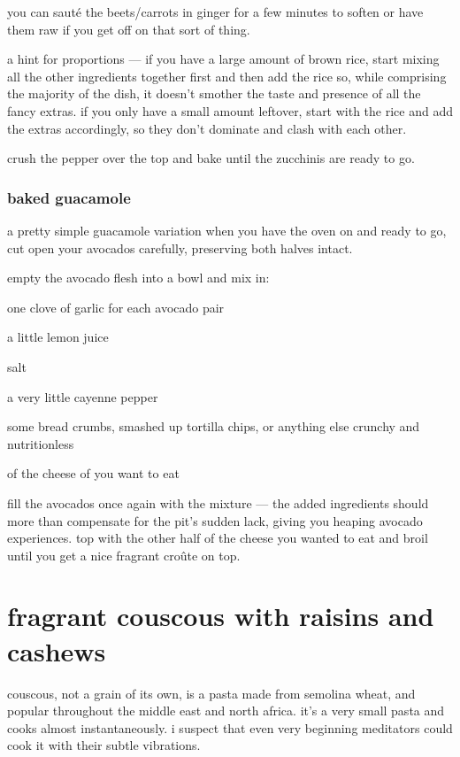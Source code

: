you can saut\'{e} the beets/carrots in ginger for a few minutes to soften or 
have them raw if you get off on that sort of thing. 

a hint for proportions --- if you have a large amount of brown rice, start 
mixing all the other ingredients together first and then add the rice so, 
while comprising the majority of the dish, it doesn't smother the taste and 
presence of all the fancy extras. if you only have a small amount leftover, 
start with the rice and add the extras accordingly, so they don't dominate and 
clash with each other.

crush the pepper over the top and bake until the zucchinis are ready to go.

\subsubsection{baked guacamole}

a pretty simple guacamole variation when you have the oven on and ready to go, 
cut open your avocados carefully, preserving both halves intact.

empty the avocado flesh into a bowl and mix in:

\begin{ingredients}
  \item one clove of garlic for each avocado pair
  \item a little lemon juice
  \item salt
  \item a very little cayenne pepper
  \item some bread crumbs, smashed up tortilla chips, or anything else crunchy and nutritionless
  \item \onehalf of the cheese of you want to eat
\end{ingredients}

fill the avocados once again with the mixture --- the added ingredients should 
more than compensate for the pit's sudden lack, giving you heaping avocado 
experiences. top with the other half of the cheese you wanted to eat and broil 
until you get a nice fragrant cro\^{u}te on top.
	
\section{fragrant couscous with raisins and cashews}

couscous, not a grain of its own, is a pasta made from semolina wheat, and 
popular throughout the middle east and north africa. it's a very small pasta 
and cooks almost instantaneously. i suspect that even very beginning 
meditators could cook it with their subtle vibrations.

